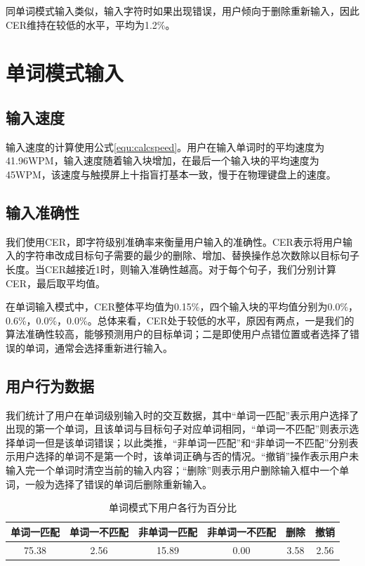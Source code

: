 同单词模式输入类似，输入字符时如果出现错误，用户倾向于删除重新输入，因此CER维持在较低的水平，平均为1.2\%。

\section{单词模式输入}

\subsection{输入速度}
输入速度的计算使用公式\ref{equ:calcspeed}。用户在输入单词时的平均速度为41.96WPM，输入速度随着输入块增加，在最后一个输入块的平均速度为45WPM，该速度与触摸屏上十指盲打基本一致\cite{2018shitoast}，慢于在物理键盘上的速度。

\subsection{输入准确性}
我们使用CER\cite{cer}，即字符级别准确率来衡量用户输入的准确性。CER表示将用户输入的字符串改成目标句子需要的最少的删除、增加、替换操作总次数除以目标句子长度。当CER越接近1时，则输入准确性越高。对于每个句子，我们分别计算CER，最后取平均值。

在单词输入模式中，CER整体平均值为0.15\%，四个输入块的平均值分别为0.0\%，0.6\%，0.0\%，0.0\%。总体来看，CER处于较低的水平，原因有两点，一是我们的算法准确性较高，能够预测用户的目标单词；二是即使用户点错位置或者选择了错误的单词，通常会选择重新进行输入。

\subsection{用户行为数据}
我们统计了用户在单词级别输入时的交互数据，其中“单词一匹配”表示用户选择了出现的第一个单词，且该单词与目标句子对应单词相同，“单词一不匹配”则表示选择单词一但是该单词错误；以此类推，“非单词一匹配”和“非单词一不匹配”分别表示用户选择的单词不是第一个时，该单词正确与否的情况。“撤销”操作表示用户未输入完一个单词时清空当前的输入内容；“删除”则表示用户删除输入框中一个单词，一般为选择了错误的单词后删除重新输入。

\begin{table}[h]
  \centering
  \begin{minipage}[t]{0.9\linewidth} %
  \caption[单词模式下用户各行为百分比]{单词模式下用户各行为百分比}
  \label{tab:word-stat}
    \centering
    \begin{tabularx}{\linewidth}{cccccc}
      \toprule[1.5pt]
      单词一匹配 & 单词一不匹配 & 非单词一匹配 & 非单词一不匹配 & 删除 & 撤销\\\midrule[1pt]
      75.38 & 2.56 & 15.89 & 0.00 & 3.58 & 2.56\\
      \bottomrule[1.5pt]
    \end{tabularx}
  \end{minipage}
\end{table}


